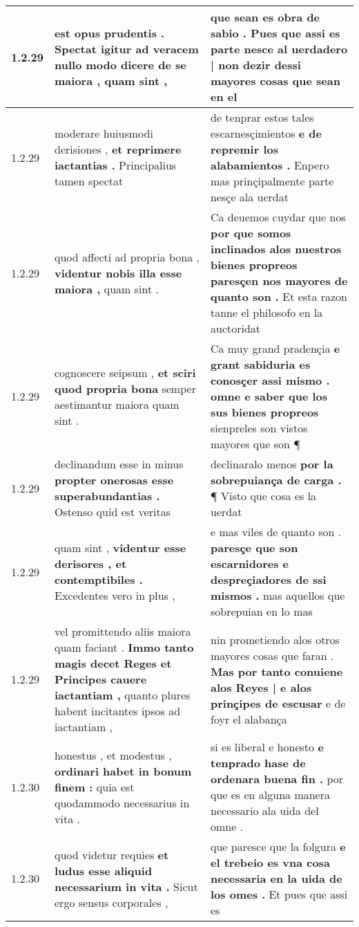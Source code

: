 \begin{tabular}{|p{1cm}|p{6.5cm}|p{6.5cm}|}
1.2.29 & est opus prudentis . \textbf{ Spectat igitur ad veracem nullo modo dicere de se maiora , } quam sint , & que sean es obra de sabio . \textbf{ Pues que assi es parte nesce al uerdadero | non dezir dessi mayores cosas } que sean en el \\\hline
1.2.29 & moderare huiusmodi derisiones , \textbf{ et reprimere iactantias . } Principalius tamen spectat & de tenprar estos tales escarnesçimientos \textbf{ e de repremir los alabamientos . } Enpero mas prinçipalmente parte nesçe ala uerdat \\\hline
1.2.29 & quod affecti ad propria bona , \textbf{ videntur nobis illa esse maiora , } quam sint . & Ca deuemos cuydar que nos \textbf{ por que somos inclinados alos nuestros bienes propreos paresçen nos mayores de quanto son . } Et esta razon tanne el philosofo en la auctoridat \\\hline
1.2.29 & cognoscere seipsum , \textbf{ et sciri quod propria bona } semper aestimantur maiora quam sint . & Ca muy grand pradençia \textbf{ e grant sabiduria es conosçer assi mismo . omne e saber que los sus bienes propreos } sienpreles son vistos mayores que son ¶ \\\hline
1.2.29 & declinandum esse in minus \textbf{ propter onerosas esse superabundantias . } Ostenso quid est veritas & declinaralo menos \textbf{ por la sobrepuiança de carga . } ¶ Visto que cosa es la uerdat \\\hline
1.2.29 & quam sint , \textbf{ videntur esse derisores , et contemptibiles . } Excedentes vero in plus , & e mas viles de quanto son . \textbf{ paresçe que son escarnidores e despreçiadores de ssi mismos . } mas aquellos que sobrepuian en lo mas \\\hline
1.2.29 & vel promittendo aliis maiora quam faciant . \textbf{ Immo tanto magis decet Reges et Principes cauere iactantiam , } quanto plures habent incitantes ipsos ad iactantiam , & nin prometiendo alos otros mayores cosas que faran . \textbf{ Mas por tanto conuiene alos Reyes | e alos prinçipes de escusar } e de foyr el alabança \\\hline
1.2.30 & honestus , et modestus , \textbf{ ordinari habet in bonum finem : } quia est quodammodo necessarius in vita . & si es liberal e honesto \textbf{ e tenprado hase de ordenara buena fin . } por que es en alguna manera necessario ala uida del omne . \\\hline
1.2.30 & quod videtur requies \textbf{ et ludus esse aliquid necessarium in vita . } Sicut ergo sensus corporales , & que paresce que la folgura \textbf{ e el trebeio es vna cosa necessaria en la uida de los omes . } Et pues que assi es \\\hline

\end{tabular}
